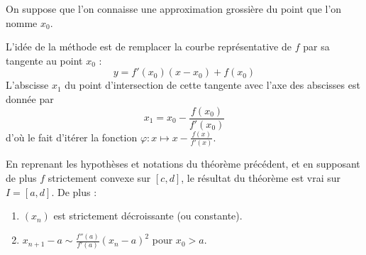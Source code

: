   \begin{remark}
    On suppose que l'on connaisse une approximation grossière du point que l'on nomme $x_0$.
    \begin{center}
    \end{center}
    L'idée de la méthode est de remplacer la courbe représentative de $f$ par sa tangente au point $x_0$ :
    \[ y = f'(x_0)(x-x_0) + f(x_0) \]
    L'abscisse $x_1$ du point d'intersection de cette tangente avec l'axe des abscisses est donnée par
    \[ x_1 = x_0 - \frac{f(x_0)}{f'(x_0)} \]
    d'où le fait d'itérer la fonction $\varphi : x \mapsto x - \frac{f(x)}{f'(x)}$.
  \end{remark}


  \begin{corollary}
    En reprenant les hypothèses et notations du théorème précédent, et en supposant de plus $f$ strictement convexe sur $[c, d]$, le résultat du théorème est vrai sur $I = [a, d]$. De plus :
    \begin{enumerate}[label=(\roman*)]
      \item $(x_n)$ est strictement décroissante (ou constante).
      \item $x_{n+1} - a \sim \frac{f''(a)}{f'(a)} (x_n - a)^2$ pour $x_0 > a$.
    \end{enumerate}
  \end{corollary}

